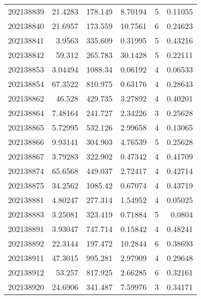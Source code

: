 \begin{tabular}{rrrrrr}
 202138839 &         21.4283  &      178.149  &            8.70194 &           5 & 0.11055 \\
 202138840 &         21.6957  &      173.559  &           10.7561  &           6 & 0.24623 \\
 202138841 &          3.9563  &      335.609  &            0.31995 &           5 & 0.43216 \\
 202138842 &         59.312   &      265.783  &           30.1428  &           5 & 0.22111 \\
 202138853 &          3.04494 &     1088.34   &            0.06192 &           4 & 0.06533 \\
 202138854 &         67.3522  &      810.975  &            0.63176 &           4 & 0.28643 \\
 202138862 &         46.528   &      429.735  &            3.27892 &           4 & 0.40201 \\
 202138864 &          7.48164 &      241.727  &            2.34226 &           3 & 0.25628 \\
 202138865 &          5.72995 &      532.126  &            2.99658 &           4 & 0.13065 \\
 202138866 &          9.93141 &      304.903  &            4.76539 &           5 & 0.25628 \\
 202138867 &          3.79283 &      322.902  &            0.47342 &           4 & 0.41709 \\
 202138874 &         65.6568  &      449.037  &            2.72417 &           4 & 0.42714 \\
 202138875 &         34.2562  &     1085.42   &            0.67074 &           4 & 0.43719 \\
 202138881 &          4.80247 &      277.314  &            1.54952 &           4 & 0.05025 \\
 202138883 &          3.25081 &      323.419  &            0.71884 &           5 & 0.0804  \\
 202138891 &          3.93047 &      747.714  &            0.15842 &           4 & 0.48241 \\
 202138892 &         22.3144  &      197.472  &           10.2844  &           6 & 0.38693 \\
 202138911 &         47.3015  &      995.281  &            2.97909 &           4 & 0.29648 \\
 202138912 &         53.257   &      817.925  &            2.66285 &           6 & 0.32161 \\
 202138920 &         24.6906  &      341.487  &            7.59976 &           3 & 0.34171 \\

\end{tabular}
